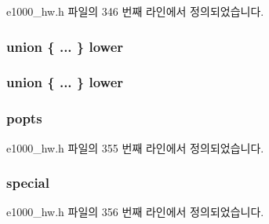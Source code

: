e1000\+\_\+hw.\+h 파일의 346 번째 라인에서 정의되었습니다.

\subsubsection[{\texorpdfstring{lower}{lower}}]{\setlength{\rightskip}{0pt plus 5cm}union \{ ... \}   lower}\hypertarget{structe1000__data__desc_ab7e18adf0e5c4c128ff70c9b680257be}{}\label{structe1000__data__desc_ab7e18adf0e5c4c128ff70c9b680257be}
\subsubsection[{\texorpdfstring{lower}{lower}}]{\setlength{\rightskip}{0pt plus 5cm}union \{ ... \}   lower}\hypertarget{structe1000__data__desc_a30a80d257a25050e49d09e9a8ff9278a}{}\label{structe1000__data__desc_a30a80d257a25050e49d09e9a8ff9278a}
\subsubsection[{\texorpdfstring{popts}{popts}}]{ popts}\hypertarget{structe1000__data__desc_a8aa10bd5571295bd051d73d057eebbf5}{}\label{structe1000__data__desc_a8aa10bd5571295bd051d73d057eebbf5}


e1000\+\_\+hw.\+h 파일의 355 번째 라인에서 정의되었습니다.

\subsubsection[{\texorpdfstring{special}{special}}]{ special}\hypertarget{structe1000__data__desc_a583ef448358a17812f8e8febe5da37a3}{}\label{structe1000__data__desc_a583ef448358a17812f8e8febe5da37a3}


e1000\+\_\+hw.\+h 파일의 356 번째 라인에서 정의되었습니다.

